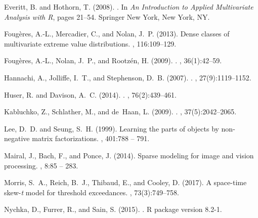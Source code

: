 \documentclass[12pt]{article}
\begin{document}
\begin{thebibliography}{}
Everitt, B. and Hothorn, T. (2008).
.
\newblock In {\em An Introduction to Applied Multivariate Analysis with R},
  pages 21--54. Springer New York, New York, NY.

Foug{\`e}res, A.-L., Mercadier, C., and Nolan, J.~P. (2013).
\newblock Dense classes of multivariate extreme value distributions.
, 116:109--129.

Foug\`eres, A.-L., Nolan, J.~P., and Rootz\'en, H. (2009).
.
, 36(1):42--59.

Hannachi, A., Jolliffe, I.~T., and Stephenson, D.~B. (2007).
.
, 27(9):1119--1152.

Huser, R. and Davison, A.~C. (2014).
.
, 76(2):439--461.

Kabluchko, Z., Schlather, M., and de~Haan, L. (2009).
.
, 37(5):2042--2065.

Lee, D.~D. and Seung, S.~H. (1999).
\newblock Learning the parts of objects by non-negative matrix factorizations.
, 401:788 -- 791.

Mairal, J., Bach, F., and Ponce, J. (2014).
\newblock Sparse modeling for image and vision processing.
, 8:85 --
  283.

Morris, S.~A., Reich, B.~J., Thibaud, E., and Cooley, D. (2017).
\newblock A space-time skew-\emph{t} model for threshold exceedances.
, 73(3):749--758.

Nychka, D., Furrer, R., and Sain, S. (2015).
.
\newblock R package version 8.2-1.


\end{thebibliography}
\end{document}
